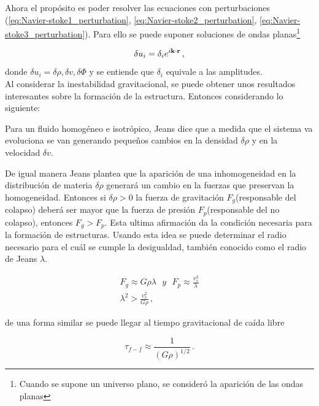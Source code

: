 Ahora el propósito es poder resolver las ecuaciones con perturbaciones (\ref{eq:Navier-stoke1_perturbation}, \ref{eq:Navier-stoke2_perturbation}, \ref{eq:Navier-stoke3_perturbation}). Para ello  se puede suponer soluciones de ondas planas\footnote{Cuando se supone un universo plano, se consideró la aparición de las ondas planas}

\begin{equation}
\delta u_{i} = \delta_{i}e^{i\bf{k}\cdot \bf{r}}\,,
\end{equation}
%
donde $\delta u_{i}= \delta\rho, \delta v, \delta\Phi$ y se entiende que $\delta_{i}$ equivale a las amplitudes. 
~\\
Al considerar la inestabilidad gravitacional, se puede obtener unos resultados  interesantes sobre la formación de la estructura. Entonces considerando lo siguiente: 

Para un fluido homogéneo e isotrópico, Jeans dice que a medida que el sistema va evoluciona se van generando pequeños cambios en la densidad $\delta \rho$ y en la velocidad $\delta v$.

De igual manera Jeans plantea que la aparición de una inhomogeneidad en la distribución de materia $\delta\rho$  generará un cambio en la fuerzas que preservan la homogeneidad. Entonces si $\delta\rho>0 $  la fuerza de gravitación $F_{g}$(responsable del colapso) deberá ser mayor que la fuerza de presión $F_{p}$(responsable del no colapso), entonces   $F_{g}>F_{p}$. Esta ultima afirmación da la condición necesaria para la formación de estructuras. Usando esta idea se puede determinar el radio necesario para el cuál se cumple la desigualdad, también conocido como el radio de Jeans $\lambda$.  

\begin{eqnarray}
F_{g} \approx G\rho\lambda \ \ \  y \ \ \ F_{p}\approx\frac{v_{s}^{2}}{\lambda}\\
\lambda^{2} > \frac{v_{s}^{2}}{G\rho} \,,
\end{eqnarray}

de una forma similar se puede llegar al tiempo gravitacional de caída libre 

\begin{equation}
\tau_{f-f} \approx \frac{1}{(G\rho)^{1/2}}\,.
\end{equation}


